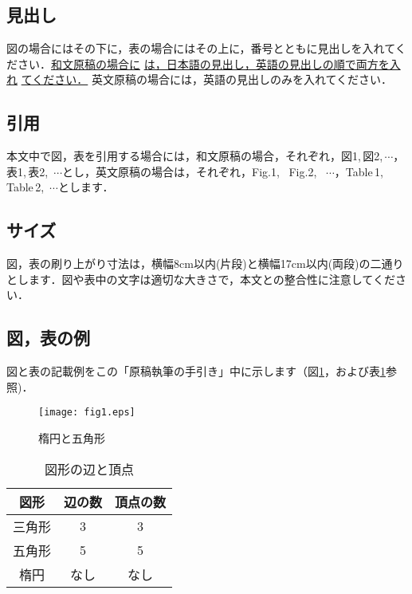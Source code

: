 \documentclass{hisken}
\begin{document}
\subsection{見出し}
図の場合にはその下に，表の場合にはその上に，番号とともに見出しを入れてください．{\underline{和文原稿の場合に} \underline{は，日本語の見出し，英語の見出しの順で両方を入れ} \underline{てください．}} 英文原稿の場合には，英語の見出しのみを入れてください．

\subsection{引用}
本文中で図，表を引用する場合には，和文原稿の場合，それぞれ，図1,\,図2,\,$ \cdots $，表1,\,表2,\, $ \cdots $とし，英文原稿の場合は，それぞれ，Fig.1, \, Fig.2, \, $ \cdots $，Table\,1,\,Table\,2,\, $ \cdots $とします．

\subsection{サイズ}
図，表の刷り上がり寸法は，横幅8cm以内(片段)と横幅17cm以内(両段)の二通りとします．図や表中の文字は適切な大きさで，本文との整合性に注意してください．

\subsection{図，表の例}
図と表の記載例をこの「原稿執筆の手引き」中に示します（図\ref{fig:example1}，および表\ref{table:example2}参照)．

\begin{figure}[tb]
	\begin{center}
    	\texttt{[image: fig1.eps]}
	\caption{楕円と五角形}		%
	\label{fig:example1}
	\end{center}
\end{figure}

\begin{table}[t]
	\begin{center}
	\caption{図形の辺と頂点}		%
	\label{table:example2}
	\begin{tabular}[hbt]{c c c}
	\hline
	\bf 図形 & \bf 辺の数 & \bf 頂点の数\\
	\hline
	三角形 & 3 & 3\\
	五角形 & 5 & 5\\
	楕円 & なし & なし\\
	\hline
	\end{tabular}
	\end{center}
\end{table}
\end{document}
